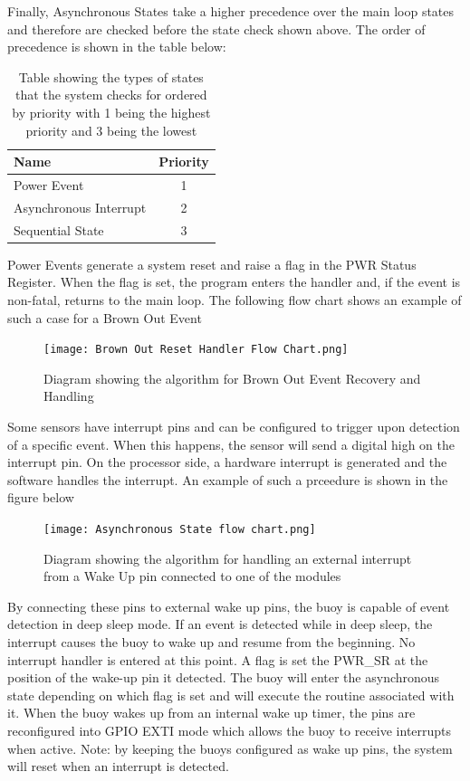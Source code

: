 Finally, Asynchronous States take a higher precedence over the main loop states and therefore are checked before the state check shown above. The order of precedence is shown in the table below:
\begin{table}[H]
    \centering
    \caption{Table showing the types of states that the system checks for ordered by priority with 1 being the highest priority and 3 being the lowest}
    \begin{tabular}{|l|c|}
         \hline
         Name & Priority \\
          \hline
         Power Event & 1 \\
         \hline
         Asynchronous Interrupt & 2 \\
             \hline
         Sequential State & 3 \\
             \hline
    \end{tabular}

    \label{tab:state_prio}
\end{table}

Power Events generate a system reset and raise a flag in the PWR Status Register. When the flag is set, the program enters the handler and, if the event is non-fatal, returns to the main loop. The following flow chart shows an example of such a case for a Brown Out Event

\begin{figure}[H]
    \centering
    \texttt{[image: Brown Out Reset Handler Flow Chart.png]}
    \caption{Diagram showing the algorithm for Brown Out Event Recovery and Handling}
    \label{fig:evt_handle}
\end{figure}

Some sensors have interrupt pins and can be configured to trigger upon detection of a specific event. When this happens, the sensor will send a digital high on the interrupt pin. On the processor side, a hardware interrupt is generated and the software handles the interrupt. An example of such a prceedure is shown in the figure below

\begin{figure}[H]
    \centering
    \texttt{[image: Asynchronous State flow chart.png]}
    \caption{Diagram showing the algorithm for handling an external interrupt from a Wake Up pin connected to one of the modules}
    \label{fig:int_handle}
\end{figure}

By connecting these pins to external wake up pins, the buoy is capable of event detection in deep sleep mode. If an event is detected while in deep sleep, the interrupt causes the buoy to wake up and resume from the beginning. No interrupt handler is entered at this point. A flag is set the PWR\_SR at the position of the wake-up pin it detected. The buoy will enter the asynchronous state depending on which flag is set and will execute the routine associated with it.  When the buoy wakes up from an internal wake up timer, the pins are reconfigured into GPIO EXTI mode which allows the buoy to receive interrupts when active. Note: by keeping the buoys configured as wake up pins, the system will reset when an interrupt is detected.

